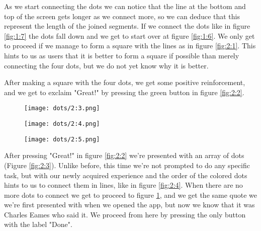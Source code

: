 As we start connecting the dots we can notice that the line at the bottom and top of the screen gets longer as we connect more, so we can deduce that this represent the length of the joined segments. If we connect the dots like in figure \ref{fig:1:7} the dots fall down and we get to start over at figure \ref{fig:1:6}. We only get to proceed if we manage to form a square with the lines as in figure \ref{fig:2:1}. This hints to us as users that it is better to form a square if possible than merely connecting the four dots, but we do not yet know why it is better.

After making a square with the four dots, we get some positive reinforcement, and we get to exclaim "Great!" by pressing the green button in figure \ref{fig:2:2}.

\begin{figure}
\centering
\captionsetup{format=multiline,font=footnotesize}
\begin{minipage}{.33333\textwidth}
  \centering
  \texttt{[image: dots/2:3.png]}
  \label{fig:2:3}
\end{minipage}%
\begin{minipage}{.33333\textwidth}
  \centering
  \texttt{[image: dots/2:4.png]}
  \label{fig:2:4}
\end{minipage}%
\begin{minipage}{.33333\textwidth}
  \centering
  \texttt{[image: dots/2:5.png]}
  \label{fig:2:5}
\end{minipage}
\end{figure}

After pressing "Great!" in figure \ref{fig:2:2} we're presented with an array of dots (Figure \ref{fig:2:3}). Unlike before, this time we're not prompted to do any specific task, but with our newly acquired experience and the order of the colored dots hints to us to connect them in lines, like in figure \ref{fig:2:4}. When there are no more dots to connect we get to proceed to figure \ref{fig:2:5}, and we get the same quote we we're first presented with when we opened the app, but now we know that it was Charles Eames who said it. We proceed from here by pressing the only button with the label "Done".

